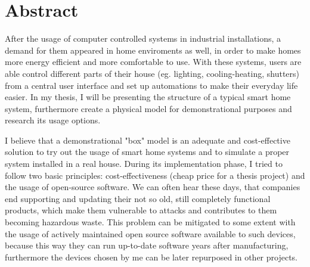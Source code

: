 

\vfill
\selectenglish


\chapter*{Abstract}

After the usage of computer controlled systems in industrial installations, a demand for them appeared in home enviroments as well, in order to make homes more energy efficient and more comfortable to use. With these systems, users are able control different parts of their house (eg. lighting, cooling-heating, shutters) from a central user interface and set up automations to make their everyday life easier. In my thesis, I will be presenting the structure of a typical smart home system, furthermore create a physical model for demonstrational purposes and research its usage options.\break

I believe that a demonstrational "box" model is an adequate and cost-effective solution to try out the usage of smart home systems and to simulate a proper system installed in a real house. During its implementation phase, I tried to follow two basic principles: cost-effectiveness (cheap price for a thesis project) and the usage of open-source software. We can often hear these days, that companies end supporting and updating their not so old, still completely functional products, which make them vulnerable to attacks and contributes to them becoming hazardous waste. This problem can be mitigated to some extent with the usage of actively maintained open source software available to such devices, because this way they can run up-to-date software years after manufacturing, furthermore the devices chosen by me can be later repurposed in other projects.\break

